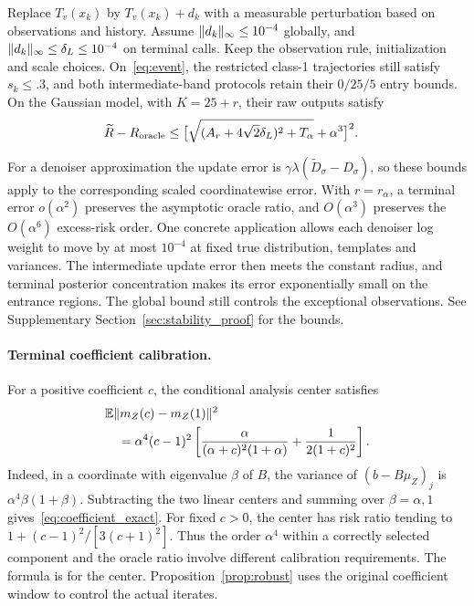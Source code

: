 \begin{proposition}\label{prop:robust}
Replace $T_v(x_k)$ by $T_v(x_k)+d_k$ with a measurable perturbation based on observations and history. Assume $\lVert d_k\rVert_\infty\le10^{-4}$ globally, and $\lVert d_k\rVert_\infty\le\delta_L\le10^{-4}$ on terminal calls. Keep the observation rule, initialization and scale choices. On~\eqref{eq:event}, the restricted class-1 trajectories still satisfy $s_k\le.3$, and both intermediate-band protocols retain their $0/25/5$ entry bounds. On the Gaussian model, with $K=25+r$, their raw outputs satisfy
\begin{align}
\widetilde R-R_{\rm oracle}
&\le\big[\sqrt{(A_r+4\sqrt{2}\delta_L)^2+T_\alpha}
             +\alpha^3\big]^2. \label{eq:robust_risk}
\end{align}
\end{proposition}
For a denoiser approximation the update error is $\gamma\lambda(\widetilde D_\sigma-D_\sigma)$, so these bounds apply to the corresponding scaled coordinatewise error. With $r=r_\alpha$, a terminal error $o(\alpha^2)$ preserves the asymptotic oracle ratio, and $O(\alpha^3)$ preserves the $O(\alpha^6)$ excess-risk order. One concrete application allows each denoiser log weight to move by at most $10^{-4}$ at fixed true distribution, templates and variances. The intermediate update error then meets the constant radius, and terminal posterior concentration makes its error exponentially small on the entrance regions. The global bound still controls the exceptional observations. See Supplementary Section~\ref{sec:stability_proof} for the bounds.

\paragraph{Terminal coefficient calibration.}
For a positive coefficient $c$, the conditional analysis center satisfies
\begin{align}
&\mathbb E\lVert m_Z(c)-m_Z(1)\rVert^2 \nonumber\\
&\quad=\alpha^4(c-1)^2
\left[\frac{\alpha}{(\alpha+c)^2(1+\alpha)}
      +\frac{1}{2(1+c)^2}\right].
\label{eq:coefficient_exact}
\end{align}
Indeed, in a coordinate with eigenvalue $\beta$ of $B$, the variance of $(b-B\mu_Z)_j$ is $\alpha^4\beta(1+\beta)$. Subtracting the two linear centers and summing over $\beta=\alpha,1$ gives~\eqref{eq:coefficient_exact}. For fixed $c>0$, the center has risk ratio tending to $1+(c-1)^2/[3(c+1)^2]$. Thus the order $\alpha^4$ within a correctly selected component and the oracle ratio involve different calibration requirements. The formula is for the center. Proposition~\ref{prop:robust} uses the original coefficient window to control the actual iterates.
